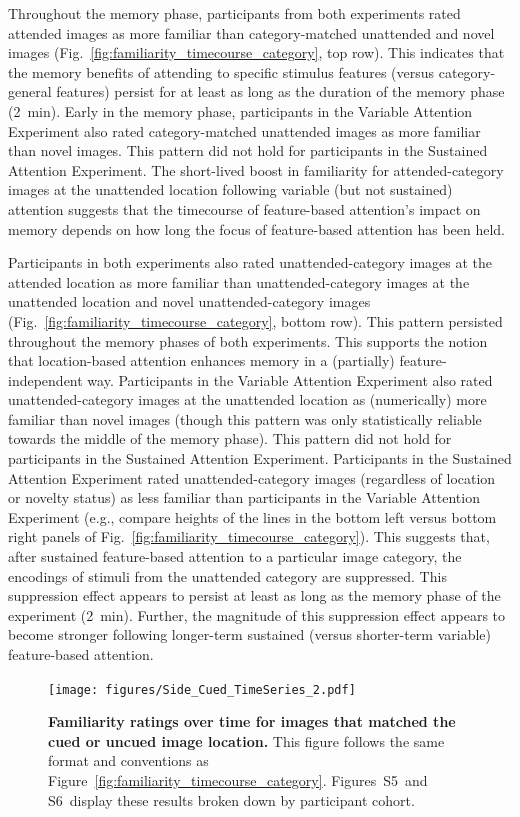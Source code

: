\documentclass[english]{article}
\newcommand{\timecourseCuedLocation}{S5}
\newcommand{\timecourseUncuedLocation}{S6}
\begin{document}
Throughout the memory phase, participants from both experiments rated attended
images as more familiar than category-matched unattended and novel images
(Fig.~\ref{fig:familiarity_timecourse_category}, top row). This indicates that
the memory benefits of attending to specific stimulus features (versus
category-general features) persist for at least as long as the duration of the
memory phase (2~min). Early in the memory phase, participants in the Variable
Attention Experiment also rated category-matched unattended images as more
familiar than novel images. This pattern did not hold for participants in the
Sustained Attention Experiment. The short-lived boost in familiarity for
attended-category images at the unattended location following variable (but not
sustained) attention suggests that the timecourse of feature-based attention's
impact on memory depends on how long the focus of feature-based attention has
been held.

Participants in both experiments also rated unattended-category images at the
attended location as more familiar than unattended-category images at the
unattended location and novel unattended-category images
(Fig.~\ref{fig:familiarity_timecourse_category}, bottom row). This pattern
persisted throughout the memory phases of both experiments. This supports the
notion that location-based attention enhances memory in a (partially)
feature-independent way. Participants in the Variable Attention Experiment also
rated unattended-category images at the unattended location as (numerically)
more familiar than novel images (though this pattern was only statistically
reliable towards the middle of the memory phase). This pattern did not hold for
participants in the Sustained Attention Experiment. Participants in the
Sustained Attention Experiment rated unattended-category images (regardless of
location or novelty status) as less familiar than participants in the Variable
Attention Experiment (e.g., compare heights of the lines in the bottom left
versus bottom right panels of Fig.~\ref{fig:familiarity_timecourse_category}).
This suggests that, after sustained feature-based attention to a particular
image category, the encodings of stimuli from the unattended category are
suppressed. This suppression effect appears to persist at least as long as the
memory phase of the experiment (2~min). Further, the magnitude of this
suppression effect appears to become stronger following longer-term sustained
(versus shorter-term variable) feature-based attention.

\begin{figure}[tp]
  \centering
  \texttt{[image: figures/Side\_Cued\_TimeSeries\_2.pdf]}

  \caption{\textbf{Familiarity ratings over time for images that matched the
  cued or uncued image location.} This figure follows the same format and
  conventions as Figure~\ref{fig:familiarity_timecourse_category}.
  Figures~\timecourseCuedLocation~and \timecourseUncuedLocation~display these
  results broken down by participant cohort.}

\label{fig:familiarity_timecourse_location}
\end{figure}
\end{document}
